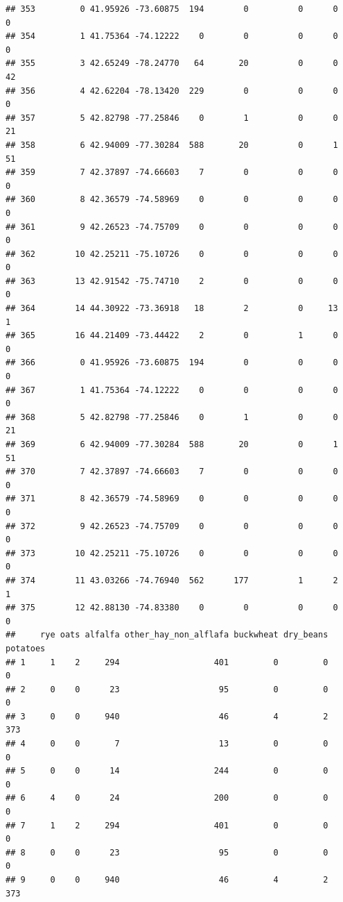 \documentclass[
]{article}
\begin{document}
\begin{verbatim}
## 353         0 41.95926 -73.60875  194        0          0      0            0
## 354         1 41.75364 -74.12222    0        0          0      0            0
## 355         3 42.65249 -78.24770   64       20          0      0           42
## 356         4 42.62204 -78.13420  229        0          0      0            0
## 357         5 42.82798 -77.25846    0        1          0      0           21
## 358         6 42.94009 -77.30284  588       20          0      1           51
## 359         7 42.37897 -74.66603    7        0          0      0            0
## 360         8 42.36579 -74.58969    0        0          0      0            0
## 361         9 42.26523 -74.75709    0        0          0      0            0
## 362        10 42.25211 -75.10726    0        0          0      0            0
## 363        13 42.91542 -75.74710    2        0          0      0            0
## 364        14 44.30922 -73.36918   18        2          0     13            1
## 365        16 44.21409 -73.44422    2        0          1      0            0
## 366         0 41.95926 -73.60875  194        0          0      0            0
## 367         1 41.75364 -74.12222    0        0          0      0            0
## 368         5 42.82798 -77.25846    0        1          0      0           21
## 369         6 42.94009 -77.30284  588       20          0      1           51
## 370         7 42.37897 -74.66603    7        0          0      0            0
## 371         8 42.36579 -74.58969    0        0          0      0            0
## 372         9 42.26523 -74.75709    0        0          0      0            0
## 373        10 42.25211 -75.10726    0        0          0      0            0
## 374        11 43.03266 -74.76940  562      177          1      2            1
## 375        12 42.88130 -74.83380    0        0          0      0            0
##     rye oats alfalfa other_hay_non_alflafa buckwheat dry_beans potatoes
## 1     1    2     294                   401         0         0        0
## 2     0    0      23                    95         0         0        0
## 3     0    0     940                    46         4         2      373
## 4     0    0       7                    13         0         0        0
## 5     0    0      14                   244         0         0        0
## 6     4    0      24                   200         0         0        0
## 7     1    2     294                   401         0         0        0
## 8     0    0      23                    95         0         0        0
## 9     0    0     940                    46         4         2      373

\end{verbatim}
\end{document}
